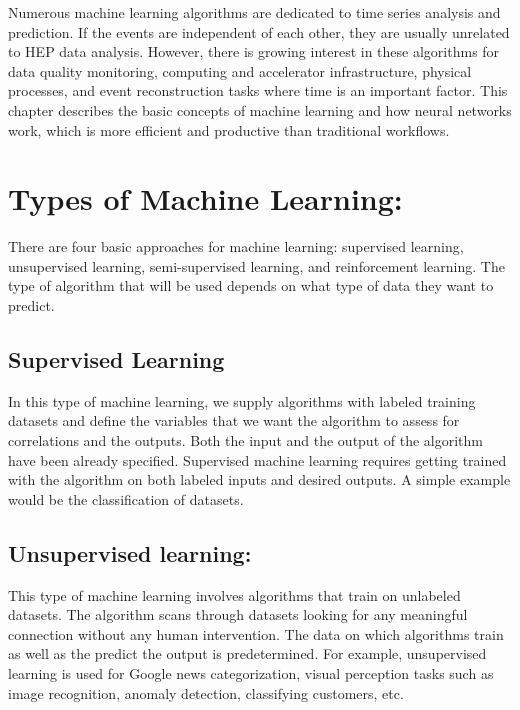 Numerous machine learning algorithms are dedicated to time series analysis and prediction. If the events are independent of each other, they are usually unrelated to HEP data analysis\cite{https://doi.org/10.48550/arxiv.2008.00444,Ismail_Fawaz_2019}. However, there is growing interest in these algorithms for data quality monitoring, computing and accelerator infrastructure, physical processes, and event reconstruction tasks where time is an important factor\cite{Alzubaidi2021}. 
 This chapter describes the basic concepts of machine learning and how neural networks work, which is more efficient and productive than traditional workflows.



\section{Types of Machine Learning:}
There are four basic approaches for machine learning: supervised learning, unsupervised learning, semi-supervised learning, and reinforcement learning\cite{Sarker2021}. The type of algorithm that will be used depends on what type of data they want to predict.

\subsection{Supervised Learning}
In this type of machine learning, we supply algorithms with labeled training datasets and define the variables that we want the algorithm to assess for correlations and the outputs. 
Both the input and the output of the algorithm have been already specified. Supervised machine learning requires getting trained with the algorithm on both labeled inputs and desired outputs. A simple example would be the classification of datasets\cite{https://doi.org/10.48550/arxiv.2003.05199}.

\subsection{Unsupervised learning:}
This type of machine learning involves algorithms that train on unlabeled datasets. The algorithm scans through datasets looking for any meaningful connection without any human intervention. The data on which algorithms train as well as the predict the output is predetermined. For example, unsupervised learning is used for Google news categorization, visual perception tasks such as image recognition, anomaly detection, classifying customers, etc\cite{Ghahramani2004}.

